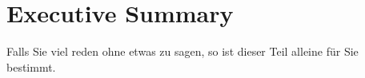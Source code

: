 \section*{Executive Summary}
Falls Sie viel reden ohne etwas zu sagen, so ist dieser Teil alleine für Sie bestimmt.

